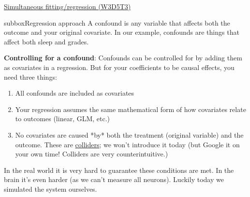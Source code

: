 \begin{textbox}{\href{https://compneuro.neuromatch.io/tutorials/W3D5_NetworkCausality/student/W3D5_Tutorial3.html}{Simultaneous fitting/regression (W3D5T3)}   }
\begin{subbox}{subbox}{Regression approach}
A confound is any variable that affects both the outcome and your original covariate. In our example, confounds are things that affect both sleep and grades. 

\textbf{Controlling for a confound}: 
Confounds can be controlled for by adding them as covariates in a regression. But for your coefficients to be causal effects, you need three things:
 \begin{enumerate}
     \item 
 All confounds are included as covariates
\item  Your regression assumes the same mathematical form of how covariates relate to outcomes (linear, GLM, etc.)
\item  No covariates are caused *by* both the treatment (original variable) and the outcome. These are \href{https://en.wikipedia.org/wiki/Collider_(statistics)}{colliders}; we won't introduce it today (but Google it on your own time! Colliders are very counterintuitive.)
 \end{enumerate}

In the real world it is very hard to guarantee these conditions are met. In the brain it's even harder (as we can't measure all neurons). Luckily today we simulated the system ourselves.

\end{subbox}
\end{textbox}
